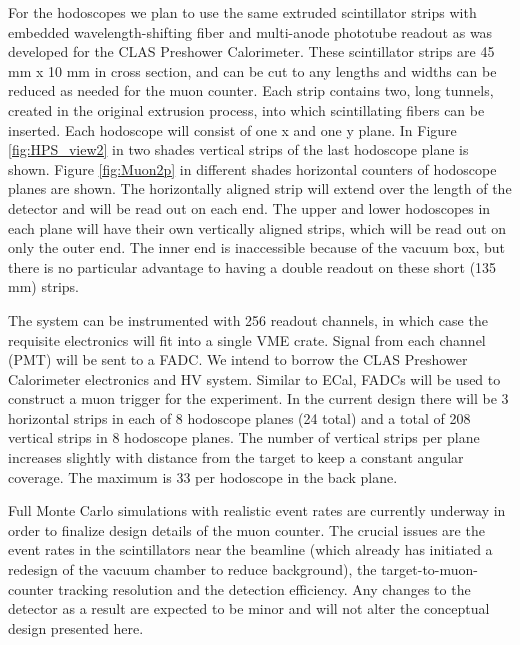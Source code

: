For the hodoscopes we plan to use the same extruded scintillator strips with embedded wavelength-shifting fiber and multi-anode phototube readout as was developed for the CLAS Preshower Calorimeter. These scintillator strips are 45 mm x 10 mm in cross section, and can be cut to any lengths and widths can be reduced as needed for the muon counter.  Each strip contains two, long tunnels, created in the original extrusion process, into which scintillating fibers can be inserted.  Each hodoscope will consist of one x and one y plane.  In Figure \ref{fig:HPS_view2} in two shades vertical strips of the last hodoscope plane is shown. Figure \ref{fig:Muon2p} in different shades horizontal counters of hodoscope planes are shown. The horizontally aligned strip will extend over the length of the detector and will be read out on each end.  The upper and lower hodoscopes in each plane will have their own vertically aligned strips, which will be read out on only the outer end.  The inner end is inaccessible because of the vacuum box, but there is no particular advantage to having a double readout on these short (135 mm) strips.  

The system can be instrumented with 256 readout channels, in which case the requisite electronics will 
fit into a single VME crate.  Signal from each channel (PMT) 
will be sent to a FADC.  We intend to borrow the CLAS Preshower Calorimeter electronics and HV system.  Similar to ECal, FADCs will be used to construct a muon trigger for the experiment.  In the current design there will be 3 horizontal strips in each of 8 hodoscope planes (24 total) and a total of 208 vertical strips in 8 hodoscope planes.  The number of vertical strips per plane increases slightly with distance from the target to keep a constant angular coverage.  The maximum is 33 per hodoscope in the back plane.

Full Monte Carlo simulations with realistic event rates are currently underway in order to finalize design details of the muon counter.  The crucial issues are the event rates in the scintillators near the beamline (which already has initiated a redesign of the vacuum chamber to reduce background), the target-to-muon-counter tracking resolution and the detection efficiency.  Any changes to the detector as a result are expected to be minor and will not alter the conceptual design presented here.

